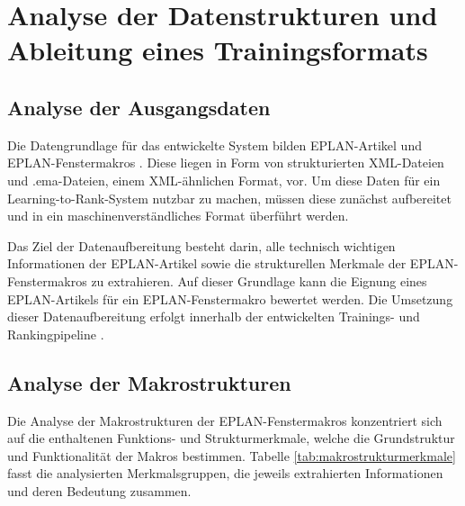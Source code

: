 \chapter{Analyse der Datenstrukturen und Ableitung eines Trainingsformats}

\section{Analyse der Ausgangsdaten}

Die Datengrundlage für das entwickelte System bilden EPLAN-Artikel \cite{EPLANArtikelverwaltung} und EPLAN-Fenstermakros \cite{EPLAN-Makros}. Diese liegen in Form von strukturierten XML-Dateien und .ema-Dateien, einem XML-ähnlichen Format, vor. Um diese Daten für ein Learning-to-Rank-System nutzbar zu machen, müssen diese zunächst aufbereitet und in ein maschinenverständliches Format überführt werden.

Das Ziel der Datenaufbereitung besteht darin, alle technisch wichtigen Informationen der EPLAN-Artikel \cite{EPLANArtikelverwaltung} sowie die strukturellen Merkmale der EPLAN-Fenstermakros \cite{EPLAN-Makros} zu extrahieren. Auf dieser Grundlage kann die Eignung eines EPLAN-Artikels \cite{EPLANArtikelverwaltung} für ein EPLAN-Fenstermakro \cite{EPLAN-Makros} bewertet werden. Die Umsetzung dieser Datenaufbereitung erfolgt innerhalb der entwickelten Trainings- und Rankingpipeline \cite{src_step911,src_pipeline}.

\section{Analyse der Makrostrukturen}

Die Analyse der Makrostrukturen der EPLAN-Fenstermakros \cite{EPLAN-Makros} konzentriert sich auf die enthaltenen Funktions- und Strukturmerkmale, welche die Grundstruktur und Funktionalität der Makros bestimmen. Tabelle \ref{tab:makrostrukturmerkmale} fasst die analysierten Merkmalsgruppen, die jeweils extrahierten Informationen und deren Bedeutung zusammen.

